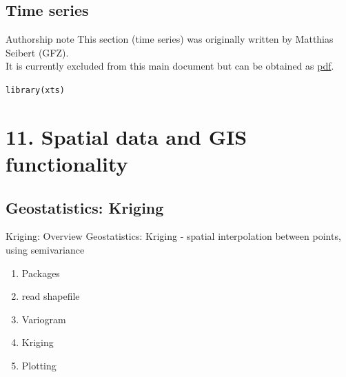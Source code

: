 \documentclass[xcolor=table,           xcolor=dvipsnames]{beamer}\usepackage[]{graphicx}\usepackage[]{color}
\makeatletter
\newcommand{\hlstd}[1]{\textcolor[rgb]{0,0,0}{#1}}
\newcommand{\hlkwd}[1]{\textcolor[rgb]{0,0,1}{#1}}
\newenvironment{kframe}{%
 \def\at@end@of@kframe{}%
 \ifinner\ifhmode%
  \def\at@end@of@kframe{\end{minipage}}%
  \begin{minipage}{\columnwidth}%
 \fi\fi%
 \def\FrameCommand##1{\hskip\@totalleftmargin \hskip-\fboxsep
 \colorbox{shadecolor}{##1}\hskip-\fboxsep
     \hskip-\linewidth \hskip-\@totalleftmargin \hskip\columnwidth}%
 \MakeFramed {\advance\hsize-\width
   \@totalleftmargin\z@ \linewidth\hsize
   \@setminipage}}%
 {\par\unskip\endMakeFramed%
 \at@end@of@kframe}
\newenvironment{knitrout}{}{} %
\makeatother
\begin{document}
\subsection{Time series}

\begin{frame}{Authorship note}
This section (time series) was originally written by Matthias Seibert (GFZ).\\
It is currently excluded from this main document but can be obtained as \href{https://dl.dropboxusercontent.com/u/4836866/R_course_Berry/RcourseBerry_Mathias.pdf}{pdf}.

\begin{knitrout}
\color{fgcolor}\begin{kframe}
\begin{alltt}
\hlkwd{library}\hlstd{(xts)}
\end{alltt}
\end{kframe}
\end{knitrout}
\end{frame}

\section{11. Spatial data and GIS functionality}

\subsection{Geostatistics: Kriging}

\begin{frame}[fragile]{Kriging: Overview}
Geostatistics: Kriging - spatial interpolation between points, using semivariance
\begin{enumerate}
\item Packages
\item read shapefile
\item Variogram
\item Kriging
\item Plotting
\end{enumerate}
\end{frame}
\end{document}
